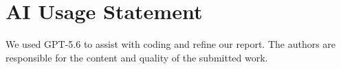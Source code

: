 \section*{AI Usage Statement}

We used GPT-5.6 to assist with coding and refine our report. The authors are responsible for the
content and quality of the submitted work.
